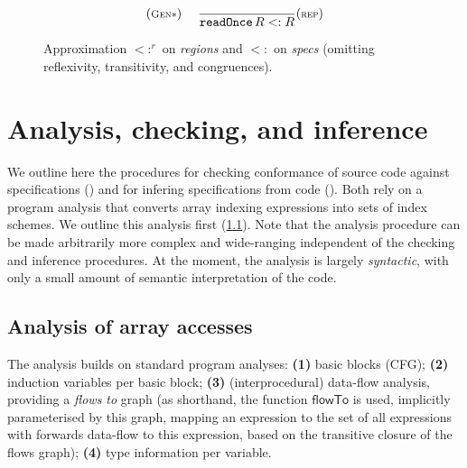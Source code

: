 \documentclass[10pt,preprint]{sigplanconf}
\newcounter{block}
\theoremstyle{definition}
\newcommand{\term}[1]{\texttt{#1}}
\newcommand{\arrayTy}{\textsf{array}}
\newcommand{\trule}[1]{{\footnotesize{(\text{#1})}}}
\begin{document}
\begin{figure}[t]
\begin{align*}
{{\begin{array}{c}
\trule{\textsc{Gen$\ast$}}
\quad
\;
\dfrac{}{\term{readOnce} \, R <: R}\trule{\textsc{rep}}
\end{array}}}
\end{align*}
\vspace{-0.5em}
\caption{Approximation $<:^r$ on \textit{regions} and
$<:$ on \textit{specs} (omitting reflexivity, transitivity, and congruences). }
\label{fig:inequations}
\vspace{-0.5em}
\end{figure}

\section{Analysis, checking, and inference}
\label{sec:analysis}

\noindent
We outline here the procedures for checking conformance
of source code against specifications ()
and for infering specifications from code ().
Both rely on a program analysis that converts array indexing
expressions into sets of index schemes. We outline this analysis
first (\cref{subsec:analysis}). Note that the analysis procedure
can be made arbitrarily more complex and wide-ranging independent
of the checking and inference procedures. At the moment, the analysis
is largely \emph{syntactic}, with only a small amount of
semantic interpretation of the code.

\subsection{Analysis of array accesses}
\label{subsec:analysis}

\newcommand{\neigh}{\textsf{neigh}}

The analysis builds on standard program analyses:
%
\textbf{(1)} basic blocks (CFG);
\textbf{(2)} induction variables per basic block;
\textbf{(3)} (interprocedural) data-flow analysis, providing a \emph{flows to}
  graph (as shorthand, the function
  $\mathsf{flowTo}$ is used, implicitly parameterised by this graph,
  mapping an expression to the set of all expressions
  with forwards data-flow to this expression, based on the transitive
  closure of the flows graph);
\textbf{(4)} type information per variable.%
\end{document}
